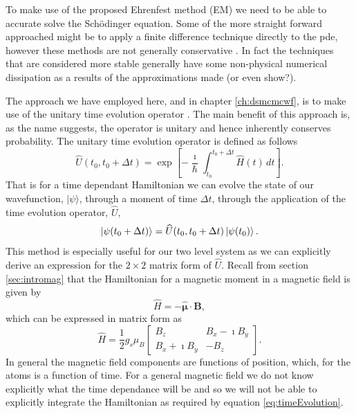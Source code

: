 To make use of the proposed Ehrenfest method (EM) we need to be able to accurate solve the Sch\"odinger equation.
Some of the more straight forward approached might be to apply a finite difference technique directly to the pde, however these methods are not generally conservative \cite{?}.
In fact the techniques that are considered more stable generally have some non-physical numerical dissipation as a results of the approximations made \cite{?} (or even show?).

The approach we have employed here, and in chapter \ref{ch:dsmcmcwf}, is to make use of the unitary time evolution operator \cite{?}.
The main benefit of this approach is, as the name suggests, the operator is unitary and hence inherently conserves probability.
The unitary time evolution operator is defined as follows
\begin{equation}
    \widehat{U}(t_0,t_0+\Delta t) = \exp\left[-\frac{\imath}{\hbar}\int_{t_0}^{t_0+\Delta t} \widehat{H}(t)\,dt \right]. \label{eq:timeEvolution}
\end{equation}
That is for a time dependant Hamiltonian we can evolve the state of our wavefunction, $\vert \psi \rangle$, through a moment of time $\Delta t$, through the application of the time evolution operator, $\widehat{U}$,
\begin{equation*}
    \ket{ \psi (t_0+\Delta t) } = \widehat{U}(t_0,t_0+\Delta t) \ket{ \psi (t_0) }.
\end{equation*}
This method is especially useful for our two level system as we can explicitly derive an expression for the $2\times2$ matrix form of $\widehat{U}$.
Recall from section \ref{sec:intromag} that the Hamiltonian for a magnetic moment in a magnetic field is given by
\begin{equation*}
    \widehat{H} = -\hat{\boldsymbol{\mu}} \cdot \mathbf{B},
\end{equation*}
which can be expressed in matrix form as
\begin{equation*}
    \widehat{H} = \frac{1}{2}g_s\mu_B \begin{bmatrix} B_z & B_x - \imath B_y \\
                                                      B_x + \imath B_y & -B_z \end{bmatrix}.                                          
\end{equation*}
In general the magnetic field components are functions of position, which, for the atoms is a function of time.
For a general magnetic field we do not know explicitly what the time dependance will be and so we will not be able to explicitly integrate the Hamiltonian as required by equation \eqref{eq:timeEvolution}.
